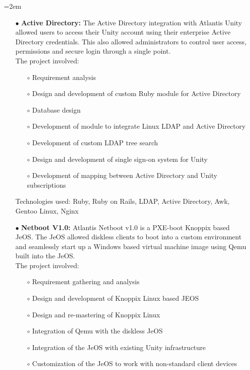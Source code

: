\documentclass{scrartcl}
\newcommand{\MarginDate}[1]{\marginpar{\raggedleft\itshape\small#1}}
\newcommand{\Description}[1]{\hangindent=2em\hangafter=0\noindent\raggedright\footnotesize{#1}\par\normalsize}
\begin{document}
\begin{cv}{
\href{http://www.develmj.com}{}
}
\Description{
\begin{itemize}
\item[\footnotesize$\bullet$] \textbf{Active Directory:}\MarginDate{Atlantis Unity} The Active Directory integration with Atlantis
  Unity allowed users to access their Unity account using their enterprise Active
  Directory credentials. This also allowed administrators to control user access,
  permissions and secure login through a single point.\\
  The project involved:
  \begin{itemize}
  \item[\footnotesize$\circ$] Requirement analysis
  \item[\footnotesize$\circ$] Design and development of custom Ruby module for Active Directory
  \item[\footnotesize$\circ$] Database design
  \item[\footnotesize$\circ$] Development of module to integrate Linux LDAP and Active Directory
  \item[\footnotesize$\circ$] Development of custom LDAP tree search
  \item[\footnotesize$\circ$] Design and development of single sign-on system for Unity
  \item[\footnotesize$\circ$] Development of mapping between Active Directory and Unity
    subscriptions
  \end{itemize}
  Technologies used: Ruby, Ruby on Rails, LDAP, Active Directory, Awk,
  Gentoo Linux, Nginx
\item[\footnotesize$\bullet$] \textbf{Netboot V1.0:} Atlantis Netboot v1.0 is a PXE-boot Knoppix based JeOS. The
JeOS allowed diskless clients to boot into a custom environment and
seamlessly start up a Windows based virtual machine image using Qemu
built into the JeOS.\\
The project involved:
  \begin{itemize}
  \item[\footnotesize$\circ$] Requirement gathering and analysis
  \item[\footnotesize$\circ$] Design and development of Knoppix Linux based JEOS
  \item[\footnotesize$\circ$] Design and re-mastering of Knoppix Linux
  \item[\footnotesize$\circ$] Integration of Qemu with the diskless JeOS
  \item[\footnotesize$\circ$] Integration of the JeOS with existing Unity infrastructure
  \item[\footnotesize$\circ$] Customization of the JeOS to work with non-standard client devices

\end{itemize}
\end{itemize}}
\end{cv}
\end{document}
